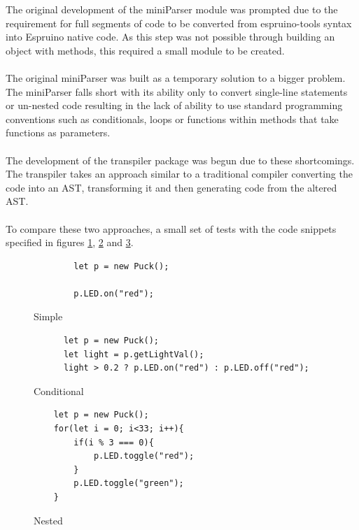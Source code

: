 \documentclass{l4proj}
\begin{document}
The original development of the miniParser module was prompted due to the requirement for full segments of code to be converted from espruino-tools syntax into Espruino native code. As this step was not possible through building an object with methods, this required a small module to be created.
\\ \\
The original miniParser was built as a temporary solution to a bigger problem. The miniParser falls short with its ability only to convert single-line statements or un-nested code resulting in the lack of ability to use standard programming conventions such as conditionals, loops or functions within methods that take functions as parameters. 
\\ \\ 
The development of the transpiler package was begun due to these shortcomings. The transpiler takes an approach similar to a traditional compiler converting the code into an AST, transforming it and then generating code from the altered AST.
\\ \\ 
To compare these two approaches, a small set of tests with the code snippets specified in figures \ref{fig:simple_transpiler_code}, \ref{fig:conditional_transpiler_code} and \ref{fig:nested_transpiler_code}.

\begin{figure}[!ht]
    \centering
    \begin{lstlisting}
        let p = new Puck();
    
        p.LED.on("red");
    \end{lstlisting}

    \caption{Simple}
    \label{fig:simple_transpiler_code}
\end{figure}

\begin{figure}[!ht]
    \centering
    \begin{lstlisting}
      let p = new Puck();
      let light = p.getLightVal();
      light > 0.2 ? p.LED.on("red") : p.LED.off("red");
    \end{lstlisting}
    \caption{Conditional}
    \label{fig:conditional_transpiler_code}
\end{figure}

\begin{figure}[!ht]
    \centering
    \begin{lstlisting}
    let p = new Puck();
    for(let i = 0; i<33; i++){
        if(i % 3 === 0){
            p.LED.toggle("red");
        }
        p.LED.toggle("green");
    }
    \end{lstlisting}
    \caption{Nested}
    \label{fig:nested_transpiler_code}
\end{figure}
\end{document}
